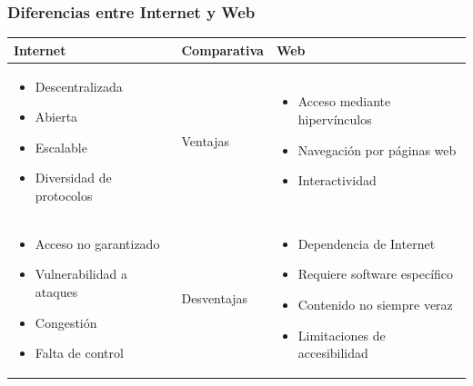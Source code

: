 \documentclass[
10pt, %
aspectratio=169, %
]{beamer}
\begin{document}
	\begin{frame}[fragile]
		
		\frametitle{Diferencias entre Internet y Web}
		
		\begin{centering}
			
			\begin{tabular}{|p{5.2cm}|p{2.6cm}|p{5.2cm}|}
				\hline
				\rowcolor{lightgray}
				\textbf{Internet} & \textbf{Comparativa} & \textbf{Web} \\ \hline
				\hline
				
				\begin{itemize}
					\item Descentralizada 
					\item Abierta 
					\item Escalable 
					\item Diversidad de protocolos
				\end{itemize}
				& \cellcolor{lightgray} Ventajas 
				& \begin{itemize}
					\item Acceso mediante hipervínculos 
					\item Navegación por páginas web 
					\item Interactividad
				\end{itemize} \\ 
				\hline
			
				\begin{itemize}
					\item Acceso no garantizado 
					\item Vulnerabilidad a ataques 
					\item Congestión 
					\item Falta de control
				\end{itemize}
				& \cellcolor{lightgray} Desventajas
				& 	\begin{itemize}
					\item Dependencia de Internet 
					\item Requiere software específico 
					\item Contenido no siempre veraz 
					\item Limitaciones de accesibilidad
				\end{itemize} \\
				\hline
				
			\end{tabular}
			
		\end{centering}
		
	\end{frame}
	
\end{document}
